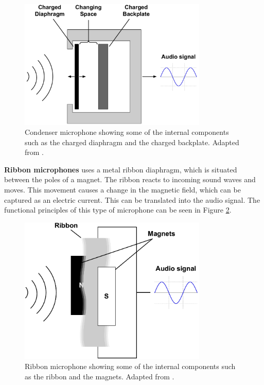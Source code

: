 \begin{figure}[H]
    \centering
    \includegraphics[width=0.8\textwidth]{figures/1Problem_analysis/condenser_microphone.pdf}
    \caption{Condenser microphone showing some of the internal components such as the charged diaphragm and the charged backplate. Adapted from \cite{Acoustics:Audio_production}.}
    \label{fig:condenser_microphone}
\end{figure}

\textbf{Ribbon microphones} uses a metal ribbon diaphragm, which is situated between the poles of a magnet. The ribbon reacts to incoming sound waves and moves. This movement causes a change in the magnetic field, which can be captured as an electric current. This can be translated into the audio signal. The functional principles of this type of microphone can be seen in Figure \ref{fig:Ribbon_microphone}. \cite{Acoustics_book_on_ribbon_microphone}

\begin{figure}[H]
    \centering
    \includegraphics[width=0.8\textwidth]{figures/1Problem_analysis/Ribbon_microphone.pdf}
    \caption{Ribbon microphone showing some of the internal components such as the ribbon and the magnets. Adapted from \cite{Acoustics_book_on_ribbon_microphone}.}
    \label{fig:Ribbon_microphone}
\end{figure}

